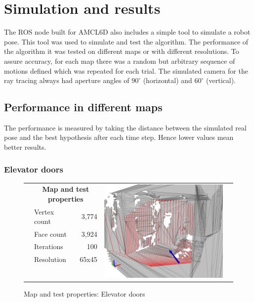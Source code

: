 \documentclass[Thesis.tex]{subfiles}
\begin{document}
\chapter{Simulation and results}

The \gls{ROS} node built for \gls{AMCL6D} also includes a simple tool to simulate a robot pose. This tool was used to simulate and test the algorithm. The performance of the algorithm it was tested on different maps or with different resolutions. To assure accuracy, for each map there was a random but arbitrary sequence of motions defined which was repeated for each trial. The simulated camera for the ray tracing always had aperture angles of $90^\circ$ (horizontal) and $60^\circ$ (vertical).

\section{Performance in different maps}
The performance is measured by taking the distance between the simulated real pose and the best hypothesis after each time step. Hence lower values mean better results.

\subsection*{Elevator doors}

\begin{figure}[h]\centering
\begin{tabularx}{\textwidth}{XlrrX}
  &\multicolumn{2}{c}{\small\bf Map and test properties} & \multirow{11}{*}{\includegraphics[width=.5\columnwidth]{pics/example_raytrace}}&\\
	&Vertex count & 3,774 &\\
  &Face count  & 3,924 &\\
  &Iterations  & 100 &\\
  &Resolution  & 65x45 &\\
  &&&\\
  &&&\\
  &&&\\
  &&&\\
  &&&\\
  &&&\\
\end{tabularx}
\caption{Map and test properties: Elevator doors}
\label{fig:elvmapprop}
\end{figure}
\end{document}
